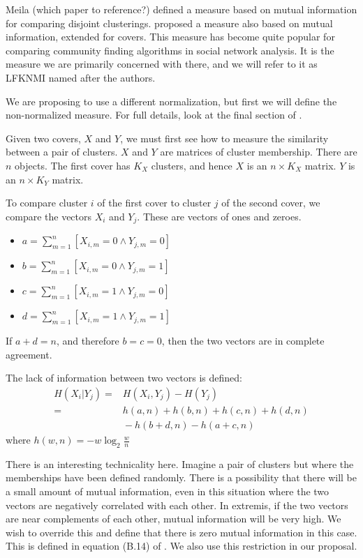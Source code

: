 \documentclass[9pt,technote]{IEEEtran}
\begin{document}
Meila (which paper to reference?) defined a measure based on mutual information for comparing disjoint clusterings.
\citet{lancichinetti-2009} proposed a measure also based on mutual information, extended for covers.
This measure has become quite popular for comparing community finding algorithms in social network analysis.
It is the measure we are primarily concerned with there, and we will refer to it as LFKNMI named after the authors.

We are proposing to use a different normalization, but first we will define the non-normalized measure.
For full details, look at the final section of \citet{lancichinetti-2009}.

Given two covers, $X$ and $Y$, we must first see how to measure the similarity between a pair of clusters.
$X$ and $Y$ are matrices of cluster membership. There are $n$ objects.
The first cover has $K_X$ clusters, and hence $X$ is an
$n \times K_X$ matrix. $Y$ is an $n \times K_Y$ matrix.

To compare cluster $i$ of the first cover to cluster $j$ of the second cover, we compare the vectors
$X_i$ and $Y_j$. These are vectors of ones and zeroes.

\begin{itemize}
	\item $              { a = \sum_{m=1}^n [X_{i,m} = 0 \wedge  Y_{j,m} = 0] } $
	\item $              { b = \sum_{m=1}^n [X_{i,m} = 0 \wedge  Y_{j,m} = 1] } $
	\item $              { c = \sum_{m=1}^n [X_{i,m} = 1 \wedge  Y_{j,m} = 0] } $
	\item $              { d = \sum_{m=1}^n [X_{i,m} = 1 \wedge  Y_{j,m} = 1] } $
\end{itemize}

If $a+d = n$, and therefore $b=c=0$, then the two vectors are in complete agreement.

The lack of information between two vectors is defined:
\begin{align}
	H(X_i | Y_j) = & {} H(X_i , Y_j) - H(Y_j)  \\
	               = & {} h(a,n) + h(b,n) + h(c,n) + h(d,n)  \\ 
		         & {} - h(b+d,n) - h(a+c,n)
\end{align}
where $h(w,n) = -w \log_2 \frac{w}{n} $

There is an interesting technicality here. Imagine a pair of clusters but where the memberships
have been defined randomly.
There is a possibility that there will be a small amount of mutual information, even in this situation where the two vectors are negatively correlated with each other.
In extremis, if the two vectors are near complements of each other, mutual information will be very high. We wish to override this and define that
there is zero mutual information in this case.
This is defined in equation (B.14) of \cite{lancichinetti-2009}.
We also use this restriction in our proposal.
\end{document}
